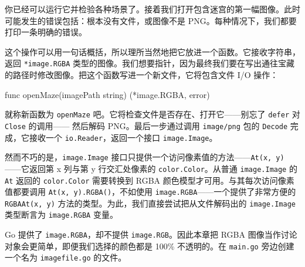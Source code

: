 你已经可以运行它并检验各种场景了。接着我们打开包含迷宫的第一幅图像。此时可能发生的错误包括：根本没有文件，或图像不是 PNG。每种情况下，我们都要打印一条明确的错误。

这个操作可以用一句话概括，所以理所当然地把它放进一个函数。它接收字符串，返回 \texttt{*image.RGBA} 类型的图像。我们想要指针，因为最终我们要在写出通往宝藏的路径时修改图像。把这个函数写进一个新文件，它将包含文件 I/O 操作：

\begin{gocode}[]
func openMaze(imagePath string) (*image.RGBA, error)
\end{gocode}

就称新函数为 \texttt{openMaze} 吧。它将检查文件是否存在、打开它——别忘了 \texttt{defer} 对 \texttt{Close} 的调用——
然后解码 PNG。最后一步通过调用 \texttt{image/png} 包的 \texttt{Decode} 完成，它接收一个 \texttt{io.Reader}，返回一个接口 \texttt{image.Image}。

然而不巧的是，\texttt{image.Image} 接口只提供一个访问像素值的方法——\texttt{At(x, y)}——它返回第 x 列与第 y 行交汇处像素的 \texttt{color.Color}。从普通 \texttt{image.Image} 的 \texttt{At} 返回的 \texttt{color.Color} 需要转换到 RGBA 颜色模型才可用。与其每次访问像素值都要调用 \texttt{At(x, y).RGBA()}，不如使用 \texttt{image.RGBA}——一个提供了非常方便的 \texttt{RGBAAt(x, y)} 方法的类型。为此，我们直接尝试把从文件解码出的 \texttt{image.Image} 类型断言为 \texttt{image.RGBA} 变量。

Go 提供了 \texttt{image.RGBA}，却不提供 \texttt{image.RGB}。因此本章把 RGBA 图像当作讨论对象会更简单，即便我们选择的颜色都是 100\% 不透明的。在 \texttt{main.go} 旁边创建一个名为 \texttt{imagefile.go} 的文件。


